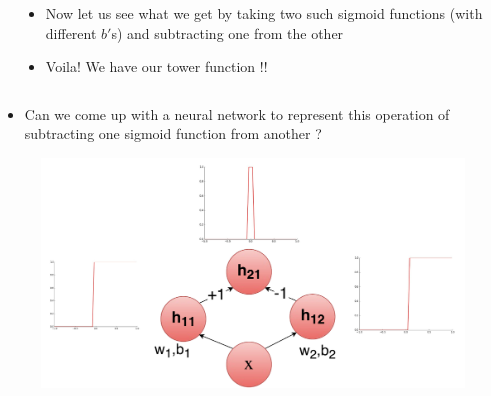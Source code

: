 \begin{frame}
	\begin{columns}
		\begin{overlayarea}{\textwidth}{\textheight}
			
		\end{overlayarea}
		\begin{overlayarea}{\textwidth}{\textheight}
			\begin{itemize}\justifying
				\item Now let us see what we get by taking two such sigmoid functions (with different $b'$s) and subtracting one from the other
				\item<4-> Voila! We have our tower function !!
			\end{itemize}
		\end{overlayarea}
	\end{columns}
\end{frame}

\begin{frame}
	\begin{itemize}\justifying
		\item Can we come up with a neural network to represent this operation of subtracting one sigmoid function from another ?
	\end{itemize}
\end{frame}


\begin{frame}
	\begin{figure}
		\includegraphics[scale=0.4]{images/module5/Plots/sig_add}
	\end{figure}
\end{frame}

